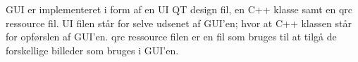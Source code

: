 \documentclass[Softwaredesign/Softwaredesign_main.tex]{subfiles}
\begin{document}
GUI er implementeret i form af en UI QT design fil,  en C++  klasse samt en qrc ressource fil. UI filen står for selve udsenet af GUI'en; hvor at C++ klassen står for opførslen af GUI'en. qrc ressource filen er en fil som bruges til at tilgå de forskellige billeder som bruges i GUI'en. 
\end{document}
